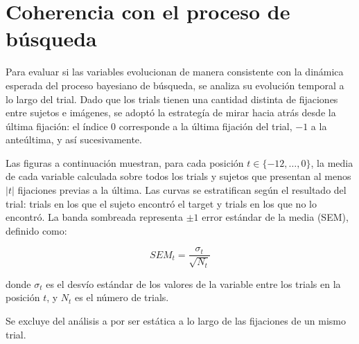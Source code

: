 \section{Coherencia con el proceso de búsqueda}
\label{sec:coherencia_busqueda}

%
%
%

Para evaluar si las variables evolucionan de manera consistente con la 
dinámica esperada del proceso bayesiano de búsqueda, se analiza su 
evolución temporal a lo largo del trial. Dado que los trials tienen una cantidad distinta de fijaciones entre sujetos e imágenes, se adoptó la estrategía de mirar hacia atrás desde la última fijación: el índice $0$ corresponde a la última fijación del trial, $-1$ a la anteúltima, y así sucesivamente.

Las figuras a continuación muestran, para cada posición 
$t \in \{-12, \ldots, 0\}$, la media de cada variable calculada sobre 
todos los trials y sujetos que presentan al menos $|t|$ fijaciones 
previas a la última. Las curvas se estratifican según el resultado del 
trial: trials en los que el sujeto encontró el target y trials en los 
que no lo encontró. La banda sombreada representa $\pm 1$ error estándar 
de la media (SEM), definido como:

\begin{equation}
    SEM_t = \frac{\sigma_t}{\sqrt{N_t}}
\end{equation}

donde $\sigma_t$ es el desvío estándar de los valores de la variable 
entre los trials en la posición $t$, y $N_t$ es el número de trials. 

Se excluye del análisis a  por ser estática a lo largo de las fijaciones de un mismo trial.

